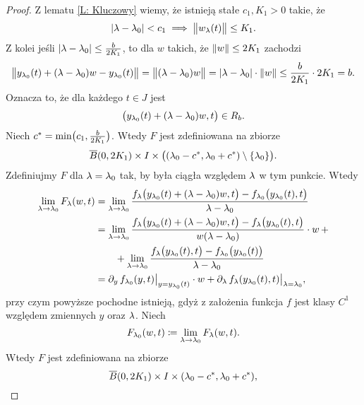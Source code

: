 \begin{proof}
  Z lematu \ref{L: Kluczowy} wiemy, że istnieją stałe $c_1, K_1 > 0$ takie, że
%
  \begin{equation*}
    \abs{ \l - \l_0 } < c_1 \implies \norm[\big]{ w_\l(t) } \le K_1.
  \end{equation*}
%
  Z kolei jeśli $\abs{ \l - \l_0 } \le \frac{ b }{ 2K_1 }$, to dla $w$ takich, że $\norm{ w } \le 2K_1$ zachodzi
%
  \begin{equation*}
    \norm[\big]{ y_{\l_0}(t) + (\l - \l_0)w - y_{\l_0}(t) } = \norm[\big]{ (\l - \l_0)w  } = \abs{ \l - \l_0 } \cdot 
    \norm{ w } \le \frac{ b }{ 2K_1 } \cdot 2K_1 = b.
  \end{equation*}
%
  Oznacza to, że dla każdego $t \in J$ jest
%
  \begin{equation*}
    \p[\big]{ y_{\l_0}(t) + (\l - \l_0)w, t} \in R_b.
  \end{equation*} 
%
  Niech $c^* = \min\p[\big]{c_1, \frac{ b }{ 2K_1 } }$. Wtedy $F$ jest zdefiniowana na zbiorze
%
  \begin{equation*}
    \overline{B}(0, 2K_1) \times I \times \p[\big]{ (\l_0 - c^*, \l_0 + c^*) \setminus \{ \l_0 \} } \text{.}
  \end{equation*}
%
Zdefiniujmy $F$ dla $\l = \l_0$ tak, by była ciągła względem $\l$ w tym punkcie. Wtedy
%
  \begin{align*}
    \lim_{\l \to \l_0} F_\l(w, t) &= \lim_{\l \to \l_0} \frac{ f_\l\p[\big]{y_{\l_0}(t) + (\l - \l_0)w, t} -  
    f_{\l_0} \p[\big]{y_{\l_0}(t), t} }{ \l - \l_0 } \\
    &=  \lim_{\l \to \l_0} \frac{ f_\l \p[\big]{y_{\l_0}(t) + (\l - \l_0)w, t} -  f_\l \p[\big]{y_{\l_0}(t), t} }{ w(\l 
    - \l_0) } \cdot w \, + \\
    &\qquad+ \lim_{\l \to \l_0} \frac{ f_\l\p[\big]{y_{\l_0}(t), t} - f_{\l_0} \p[\big]{y_{\l_0}(t)} }{ \l - \l_0 } \\
    &= \pd{ y } f_{\l_0} (y, t) \big\vert_{ y = y_{\l_0}(t) } \cdot w + \pd{ \l } f_{\l}( y_{\l_0}(t), t) 
    \big\vert_{ \l = \l_0 },
  \end{align*}
%
  przy czym powyższe pochodne istnieją, gdyż z założenia funkcja $f$ jest klasy $C^1$ względem zmiennych $y$ oraz $\l$. 
  Niech
%
  \begin{equation*}
    F_{\l_0}(w, t) \coloneqq \lim_{\l \to \l_0} F_\l(w, t).
  \end{equation*}
%
  Wtedy $F$ jest zdefiniowana na zbiorze
%
  \begin{equation*}
    \overline{B}(0, 2K_1) \times I \times (\l_0 - c^*, \l_0 + c^*),

\end{equation*}
\end{proof}
